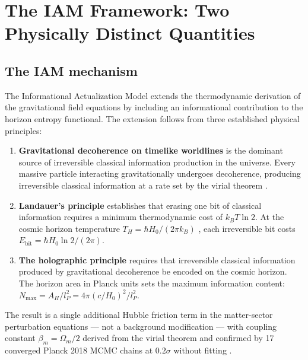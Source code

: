 \documentclass[12pt,a4paper]{article}
\begin{document}
\section{The IAM Framework: Two Physically Distinct Quantities}
\label{sec:framework}

\subsection{The IAM mechanism}

The Informational Actualization Model \citep{mahaffey2026} extends the
thermodynamic derivation of the gravitational field equations
\citep{jacobson1995} by including an informational contribution to the
horizon entropy functional. The extension follows from three established
physical principles:

\begin{enumerate}
\item \textbf{Gravitational decoherence on timelike worldlines} is the
dominant source of irreversible classical information production in the
universe. Every massive particle interacting gravitationally undergoes
decoherence, producing irreversible classical information at a rate set
by the virial theorem \citep{mahaffey2026_virial}.

\item \textbf{Landauer's principle} \citep{landauer1961} establishes that
erasing one bit of classical information requires a minimum thermodynamic
cost of $k_B T \ln 2$. At the cosmic horizon temperature $T_H =
\hbar H_0 / (2\pi k_B)$ \citep{gibbons1977}, each irreversible bit costs
$E_\mathrm{bit} = \hbar H_0 \ln 2 / (2\pi)$.

\item \textbf{The holographic principle} \citep{thooft1993,susskind1995}
requires that irreversible classical information produced by gravitational
decoherence be encoded on the cosmic horizon. The horizon area in Planck
units sets the maximum information content:
$N_\mathrm{max} = A_H / l_P^2 = 4\pi(c/H_0)^2/l_P^2$.
\end{enumerate}

The result is a single additional Hubble friction term in the matter-sector
perturbation equations — not a background modification — with coupling
constant $\beta_m = \Omega_m/2$ derived from the virial theorem and
confirmed by 17 converged Planck 2018 MCMC chains at $0.2\sigma$ without
fitting \citep{mahaffey2026}.
\end{document}
